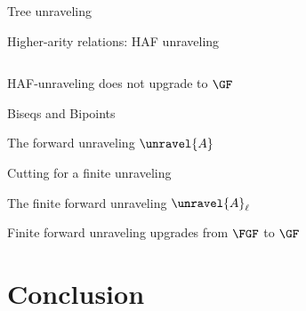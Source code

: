 \documentclass[aspectratio=169]{beamer}
\begin{document}

\begin{frame}{Tree unraveling}
  \begin{center}
    
  \end{center}
\end{frame}


\begin{frame}{Higher-arity relations: HAF unraveling}
  
  

  \begin{columns}
    \begin{column}{0.2\textwidth}
      \begin{overprint}


      \end{overprint}
    \end{column}
    \begin{column}{0.75\textwidth}
      \begin{overprint}
        \exunravelstruct{}


        \exunravelhat{}
      \end{overprint}
    \end{column}
  \end{columns}
\end{frame}

\begin{frame}{HAF-unraveling does not upgrade to $\GF$}
  
\end{frame}

\begin{frame}{Biseqs and Bipoints}
  
\end{frame}

\begin{frame}{The forward unraveling $\unravel{A}$}
  
\end{frame}

\begin{frame}{Cutting for a finite unraveling}
  \begin{center}
    
  \end{center}
\end{frame}

\begin{frame}{The finite forward unraveling $\unravel{A}_{\ell}$}
  
\end{frame}

\begin{frame}{Finite forward unraveling upgrades from $\FGF$ to $\GF$}
\end{frame}

\section{Conclusion}
\end{document}
